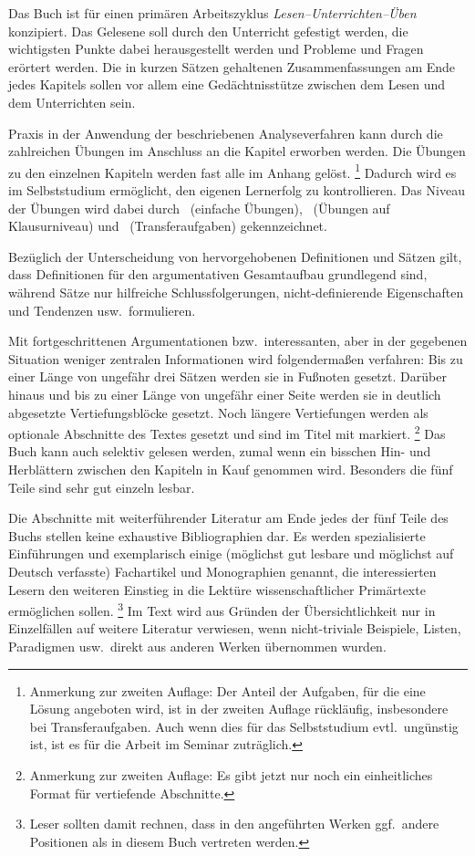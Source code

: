 Das Buch ist für einen primären Arbeitszyklus \textit{Lesen--Unterrichten--Üben} konzipiert.
Das Gelesene soll durch den Unterricht gefestigt werden, die wichtigsten Punkte dabei herausgestellt werden und Probleme und Fragen erörtert werden.
Die in kurzen Sätzen gehaltenen Zusammenfassungen am Ende jedes Kapitels sollen vor allem eine Gedächtnisstütze zwischen dem Lesen und dem Unterrichten sein.

Praxis in der Anwendung der beschriebenen Analyseverfahren kann durch die zahlreichen Übungen im Anschluss an die Kapitel erworben werden.
Die Übungen zu den einzelnen Kapiteln werden fast alle im Anhang gelöst.%
\footnote{Anmerkung zur zweiten Auflage:
Der Anteil der Aufgaben, für die eine Lösung angeboten wird, ist in der zweiten Auflage rückläufig, insbesondere bei Transferaufgaben.
Auch wenn dies für das Selbststudium evtl.\ ungünstig ist, ist es für die Arbeit im Seminar zuträglich.}
Dadurch wird es im Selbststudium ermöglicht, den eigenen Lernerfolg zu kontrollieren.
Das Niveau der Übungen wird dabei durch \onestar\ (einfache Übungen), \twostar\ (Übungen auf Klausurniveau) und \tristar\ (Transferaufgaben) gekennzeichnet.

Bezüglich der Unterscheidung von hervorgehobenen Definitionen und Sätzen gilt, dass Definitionen für den argumentativen Gesamtaufbau grundlegend sind, während Sätze nur hilfreiche Schlussfolgerungen, nicht-definierende Eigenschaften und Tendenzen usw.\ formulieren.

Mit fortgeschrittenen Argumentationen bzw.\ interessanten, aber in der gegebenen Situation weniger zentralen Informationen wird folgendermaßen verfahren:
Bis zu einer Länge von ungefähr drei Sätzen werden sie in Fußnoten gesetzt.
Darüber hinaus und bis zu einer Länge von ungefähr einer Seite werden sie in deutlich abgesetzte Vertiefungsblöcke gesetzt.
Noch längere Vertiefungen werden als optionale Abschnitte des Textes gesetzt und sind im Titel mit \Opsional markiert.%
\footnote{Anmerkung zur zweiten Auflage:
Es gibt jetzt nur noch ein einheitliches Format für vertiefende Abschnitte.}
Das Buch kann auch selektiv gelesen werden, zumal wenn ein bisschen Hin- und Herblättern zwischen den Kapiteln in Kauf genommen wird.
Besonders die fünf Teile sind sehr gut einzeln lesbar.

Die Abschnitte mit weiterführender Literatur am Ende jedes der fünf Teile des Buchs stellen keine exhaustive Bibliographien dar.
Es werden spezialisierte Einführungen und exemplarisch einige (möglichst gut lesbare und möglichst auf Deutsch verfasste) Fachartikel und Monographien genannt, die interessierten Lesern den weiteren Einstieg in die Lektüre wissenschaftlicher Primärtexte ermöglichen sollen.%
\footnote{Leser sollten damit rechnen, dass in den angeführten Werken ggf.\ andere Positionen als in diesem Buch vertreten werden.}
Im Text wird aus Gründen der Übersichtlichkeit nur in Einzelfällen auf weitere Literatur verwiesen, \zB wenn nicht-triviale Beispiele, Listen, Paradigmen usw.\ direkt aus anderen Werken übernommen wurden.


